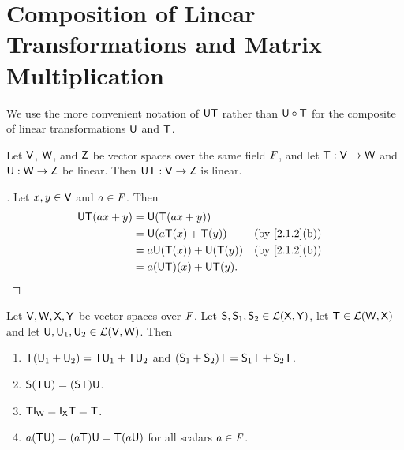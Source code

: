 \section{Composition of Linear Transformations and Matrix Multiplication}\label{sec:2.3}

\begin{note}
  We use the more convenient notation of \(\mathsf{U} \mathsf{T}\) rather than \(\mathsf{U} \circ \mathsf{T}\) for the composite of linear transformations \(\mathsf{U}\) and \(\mathsf{T}\).
\end{note}

\begin{thm}\label{2.9}
  Let \(\mathsf{V}\), \(\mathsf{W}\), and \(\mathsf{Z}\) be vector spaces over the same field \(\mathit{F}\), and let \(\mathsf{T} : \mathsf{V} \to \mathsf{W}\) and \(\mathsf{U} : \mathsf{W} \to \mathsf{Z}\) be linear.
  Then \(\mathsf{U} \mathsf{T} : \mathsf{V} \to \mathsf{Z}\) is linear.
\end{thm}

\begin{proof}[]
  Let \(x, y \in \mathsf{V}\) and \(a \in \mathit{F}\).
  Then
  \begin{align*}
    \U \T(ax + y) & = \U(\T(ax + y))                                            \\
                  & = \U(a \T(x) + \T(y))      &  & \text{(by \cref{2.1.2}(b))} \\
                  & = a \U(\T(x)) + \U(\T(y))  &  & \text{(by \cref{2.1.2}(b))} \\
                  & = a (\U \T)(x) + \U \T(y).
  \end{align*}
\end{proof}

\begin{thm}\label{2.10}
  Let \(\mathsf{V}, \mathsf{W}, \mathsf{X}, \mathsf{Y}\) be vector spaces over \(\mathit{F}\).
  Let \(\mathsf{S}, \mathsf{S}_1, \mathsf{S}_2 \in \mathcal{L}(\mathsf{X}, \mathsf{Y})\), let \(\mathsf{T} \in \mathcal{L}(\mathsf{W}, \mathsf{X})\) and let \(\mathsf{U}, \mathsf{U}_1, \mathsf{U}_2 \in \mathcal{L}(\mathsf{V}, \mathsf{W})\).
  Then
  \begin{enumerate}
    \item \(\mathsf{T}(\mathsf{U}_1 + \mathsf{U}_2) = \mathsf{T} \mathsf{U}_1 + \mathsf{T} \mathsf{U}_2\) and \((\mathsf{S}_1 + \mathsf{S}_2) \mathsf{T} = \mathsf{S}_1 \mathsf{T} + \mathsf{S}_2 \mathsf{T}\).
    \item \(\mathsf{S} (\mathsf{T} \mathsf{U}) = (\mathsf{S} \mathsf{T}) \mathsf{U}\).
    \item \(\T \IT[\W] = \IT[\vs{X}] \T = \T\).
    \item \(a(\mathsf{T} \mathsf{U}) = (a \mathsf{T}) \mathsf{U} = \mathsf{T} (a \mathsf{U})\) for all scalars \(a \in \mathit{F}\).
  \end{enumerate}
\end{thm}

